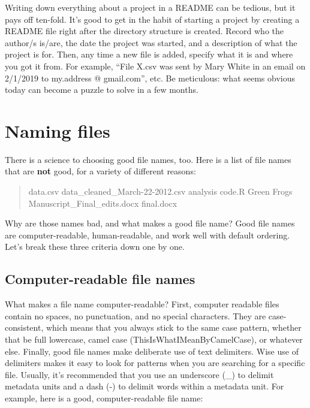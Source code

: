 \documentclass[
]{book}
\begin{document}
Writing down everything about a project in a README can be tedious, but it pays off ten-fold. It's good to get in the habit of starting a project by creating a README file right after the directory structure is created. Record who the author/s is/are, the date the project was started, and a description of what the project is for. Then, any time a new file is added, specify what it is and where you got it from. For example, ``File X.csv was sent by Mary White in an email on 2/1/2019 to my.address @ gmail.com'', etc. Be meticulous: what seems obvious today can become a puzzle to solve in a few months.

\hypertarget{naming-files}{%
\section{Naming files}\label{naming-files}}

There is a science to choosing good file names, too. Here is a list of file names that are \textbf{not} good, for a variety of different reasons:

\begin{quote}
data.csv
data\_cleaned\_March-22-2012.csv
analysis code.R
Green Frogs Manuscript\_Final\_edits.docx
final.docx
\end{quote}

Why are those names bad, and what makes a good file name? Good file names are computer-readable, human-readable, and work well with default ordering. Let's break these three criteria down one by one.

\hypertarget{computer-readable-file-names}{%
\subsection{Computer-readable file names}\label{computer-readable-file-names}}

What makes a file name computer-readable? First, computer readable files contain no spaces, no punctuation, and no special characters. They are case-consistent, which means that you always stick to the same case pattern, whether that be full lowercase, camel case (ThisIsWhatIMeanByCamelCase), or whatever else. Finally, good file names make deliberate use of text delimiters. Wise use of delimiters makes it easy to look for patterns when you are searching for a specific file. Usually, it's recommended that you use an underscore (\_) to delimit metadata units and a dash (-) to delimit words within a metadata unit. For example, here is a good, computer-readable file name:
\end{document}
